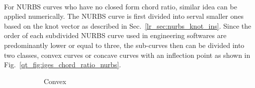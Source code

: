 \paragraph{}
For NURBS curves who have no closed form chord ratio, similar idea can be applied numerically.
The NURBS curve is first divided into serval smaller ones based on the knot vector as described in Sec.~\ref{lr_sec:nurbs_knot_ins}.  %
Since the order of each subdivided NURBS curve used in engineering softwares are predominantly lower or equal to three, the sub-curves then can be divided into two classes, convex curves or concave curves with an inflection point as shown in Fig.~\ref{qt_fig:iges_chord_ratio_nurbs}.
    \begin{figure}
        \begin{subfigure}[b]{0.5\linewidth}
            \centering
            \caption{Convex}
        \end{subfigure}
        \begin{subfigure}[b]{0.5\linewidth}
            \centering
\end{subfigure}
\end{figure}
